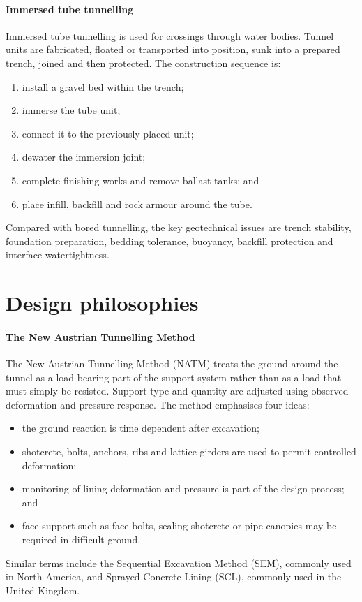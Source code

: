 \paragraph{Immersed tube tunnelling}
\label{sec:immersed-tube}
Immersed tube tunnelling is used for crossings through water bodies. Tunnel units are fabricated, floated or transported into position, sunk into a prepared trench, joined and then protected. The construction sequence is:
\begin{enumerate}
 \item install a gravel bed within the trench;
 \item immerse the tube unit;
 \item connect it to the previously placed unit;
 \item dewater the immersion joint;
 \item complete finishing works and remove ballast tanks; and
 \item place infill, backfill and rock armour around the tube.
\end{enumerate}
Compared with bored tunnelling, the key geotechnical issues are trench stability, foundation preparation, bedding tolerance, buoyancy, backfill protection and interface watertightness.

\section{Design philosophies}
\label{sec:design-philosophies}

\paragraph{The New Austrian Tunnelling Method}
\label{sec:natm}
The New Austrian Tunnelling Method (NATM) treats the ground around the tunnel as a load-bearing part of the support system rather than as a load that must simply be resisted. Support type and quantity are adjusted using observed deformation and pressure response. The method emphasises four ideas:
\begin{itemize}
 \item the ground reaction is time dependent after excavation;
 \item shotcrete, bolts, anchors, ribs and lattice girders are used to permit controlled deformation;
 \item monitoring of lining deformation and pressure is part of the design process; and
 \item face support such as face bolts, sealing shotcrete or pipe canopies may be required in difficult ground.
\end{itemize}
Similar terms include the Sequential Excavation Method (SEM), commonly used in North America, and Sprayed Concrete Lining (SCL), commonly used in the United Kingdom.


